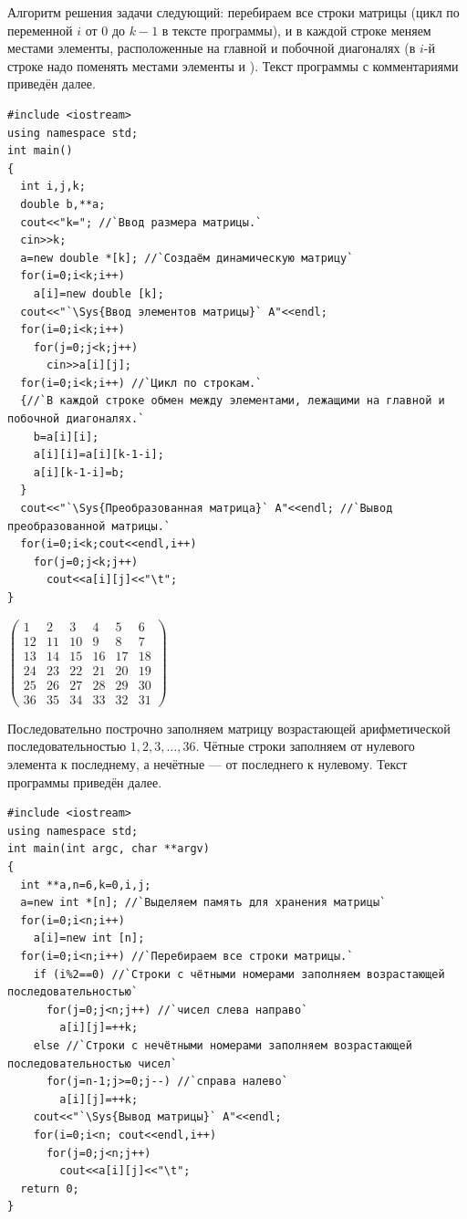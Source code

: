Алгоритм решения задачи следующий: перебираем все строки матрицы (цикл по переменной $i$ от $0$ до
$k-1$ в тексте программы), и в каждой строке меняем местами элементы, расположенные на главной и
побочной диагоналях (в $i$-й строке надо поменять местами элементы  и ).
Текст программы с комментариями приведён  далее.
\begin{lstlisting}
#include <iostream>
using namespace std;
int main()
{
  int i,j,k;
  double b,**a; 
  cout<<"k="; //`Ввод размера матрицы.`
  cin>>k;
  a=new double *[k]; //`Создаём динамическую матрицу`
  for(i=0;i<k;i++)
    a[i]=new double [k];
  cout<<"`\Sys{Ввод элементов матрицы}` A"<<endl;
  for(i=0;i<k;i++)
    for(j=0;j<k;j++)
      cin>>a[i][j];
  for(i=0;i<k;i++) //`Цикл по строкам.`
  {//`В каждой строке обмен между элементами, лежащими на главной и побочной диагоналях.`
    b=a[i][i];
    a[i][i]=a[i][k-1-i];
    a[i][k-1-i]=b;
  }
  cout<<"`\Sys{Преобразованная матрица}` A"<<endl; //`Вывод преобразованной матрицы.`
  for(i=0;i<k;cout<<endl,i++)
    for(j=0;j<k;j++)
      cout<<a[i][j]<<"\t";
}
\end{lstlisting}


$\left(\begin{matrix}
1&2&3&4&5&6\\
12&11&10&9&8&7\\
13&14&15&16&17&18\\
24&23&22&21&20&19\\
25&26&27&28&29&30\\
36&35&34&33&32&31
\end{matrix}\right)$%

Последовательно построчно заполняем матрицу возрастающей арифметической последовательностью  $1,2,3,{\dots},36$. Чётные
строки заполняем от нулевого элемента к последнему, а нечётные --- от последнего к нулевому. Текст программы приведён
далее.
\begin{lstlisting}
#include <iostream>
using namespace std;
int main(int argc, char **argv)
{
  int **a,n=6,k=0,i,j;
  a=new int *[n]; //`Выделяем память для хранения матрицы`
  for(i=0;i<n;i++)
    a[i]=new int [n];
  for(i=0;i<n;i++) //`Перебираем все строки матрицы.`
    if (i%2==0) //`Строки с чётными номерами заполняем возрастающей последовательностью`
      for(j=0;j<n;j++) //`чисел слева направо`
        a[i][j]=++k;
    else //`Строки с нечётными номерами заполняем возрастающей последовательностью чисел`
      for(j=n-1;j>=0;j--) //`справа налево`
        a[i][j]=++k;
    cout<<"`\Sys{Вывод матрицы}` A"<<endl;
    for(i=0;i<n; cout<<endl,i++)
      for(j=0;j<n;j++)
        cout<<a[i][j]<<"\t";
  return 0;
}
\end{lstlisting}

